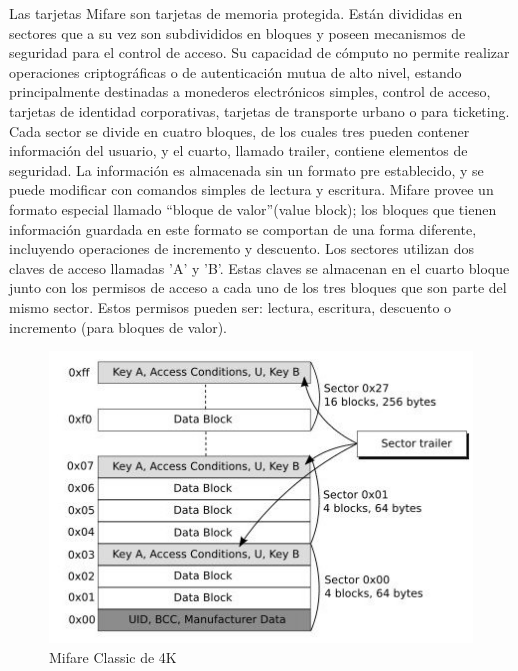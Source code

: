 Las tarjetas Mifare son tarjetas de memoria protegida. Están divididas en sectores que a su vez son subdivididos en bloques y poseen mecanismos de seguridad para el control de acceso. Su capacidad de cómputo no permite realizar operaciones criptográficas o de autenticación mutua de alto nivel, estando principalmente destinadas a monederos electrónicos simples, control de acceso, tarjetas de identidad corporativas, tarjetas de transporte urbano o para ticketing.
Cada sector se divide en cuatro bloques, de los cuales tres pueden contener información del usuario, y el cuarto, llamado trailer, contiene elementos de seguridad. La información es almacenada sin un  formato pre establecido, y se puede modificar con comandos simples de lectura y escritura. Mifare provee un formato especial llamado “bloque de valor”(value block); los bloques que tienen información guardada en este formato se comportan de una forma diferente, incluyendo operaciones de incremento y descuento.
Los sectores utilizan dos claves de acceso llamadas 'A' y 'B'. Estas claves se almacenan en el cuarto bloque junto con los permisos de acceso a cada uno de los tres bloques que son parte del mismo sector. Estos permisos pueden ser: lectura, escritura, descuento o incremento (para bloques de valor).

\begin{figure}[H]
\centering
  \begin{center}
  \includegraphics[scale=.6]{Imagenes/sc3.jpg} 
  \end{center}
  \caption{Mifare Classic de 4K}\label{Fig:MC_4K} 
\end{figure}

